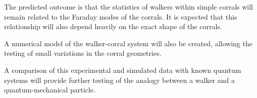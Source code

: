 \documentclass[11pt,twocolumn]{article}
\begin{document}
The predicted outcome is that the statistics of walkers within simple corrals will remain related to the Faraday modes of the corrals.  It is expected that this relationship will also depend heavily on the exact shape of the corrals.

A numerical model of the walker-corral system will also be created, allowing the testing of small variations in the corral geometries.

A comparison of this experimental and simulated data with known quantum systems will provide further testing of the analogy between a walker and a quantum-mechanical particle.


 
\end{document}
